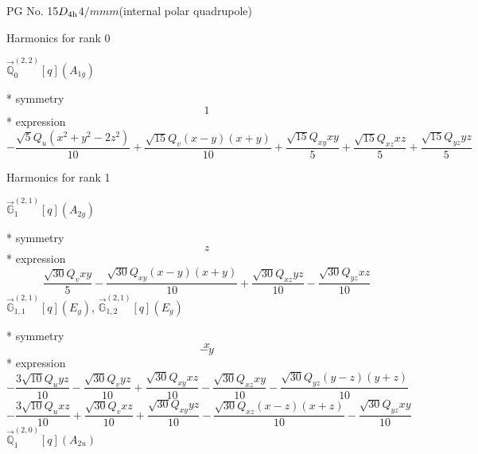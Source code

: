 \documentclass[fleqn,8pt]{jsarticle}
\begin{document}
\setcounter{MaxMatrixCols}{32}

\renewcommand{\tablename}{Table~}
\renewcommand{\figurename}{Figure~}
\begin{center}
\LARGE
PG No. 15\quad$D_{\rm 4h}$\quad$4/mmm$\quad[ tetragonal ] (internal polar quadrupole)
\end{center}

\noindent * Harmonics for rank 0

\noindent\quad $\vec{\mathbb{Q}}_{0}^{(2,2)}[q](A_{1g})$

\noindent\quad ** symmetry
\begin{dmath*}
1
\end{dmath*}
\noindent\quad ** expression
\begin{dmath*}
- \frac{\sqrt{5} Q_{u} \left(x^{2} + y^{2} - 2 z^{2}\right)}{10} + \frac{\sqrt{15} Q_{v} \left(x - y\right) \left(x + y\right)}{10} + \frac{\sqrt{15} Q_{xy} x y}{5} + \frac{\sqrt{15} Q_{xz} x z}{5} + \frac{\sqrt{15} Q_{yz} y z}{5}
\end{dmath*}

\noindent * Harmonics for rank 1

\noindent\quad $\vec{\mathbb{G}}_{1}^{(2,1)}[q](A_{2g})$

\noindent\quad ** symmetry
\begin{dmath*}
z
\end{dmath*}
\noindent\quad ** expression
\begin{dmath*}
\frac{\sqrt{30} Q_{v} x y}{5} - \frac{\sqrt{30} Q_{xy} \left(x - y\right) \left(x + y\right)}{10} + \frac{\sqrt{30} Q_{xz} y z}{10} - \frac{\sqrt{30} Q_{yz} x z}{10}
\end{dmath*}
\noindent\quad $\vec{\mathbb{G}}_{1,1}^{(2,1)}[q](E_{g})$, $\vec{\mathbb{G}}_{1,2}^{(2,1)}[q](E_{g})$

\noindent\quad ** symmetry
\begin{dmath*}
x
\end{dmath*}
\begin{dmath*}
- y
\end{dmath*}
\noindent\quad ** expression
\begin{dmath*}
- \frac{3 \sqrt{10} Q_{u} y z}{10} - \frac{\sqrt{30} Q_{v} y z}{10} + \frac{\sqrt{30} Q_{xy} x z}{10} - \frac{\sqrt{30} Q_{xz} x y}{10} - \frac{\sqrt{30} Q_{yz} \left(y - z\right) \left(y + z\right)}{10}
\end{dmath*}
\begin{dmath*}
- \frac{3 \sqrt{10} Q_{u} x z}{10} + \frac{\sqrt{30} Q_{v} x z}{10} + \frac{\sqrt{30} Q_{xy} y z}{10} - \frac{\sqrt{30} Q_{xz} \left(x - z\right) \left(x + z\right)}{10} - \frac{\sqrt{30} Q_{yz} x y}{10}
\end{dmath*}
\noindent\quad $\vec{\mathbb{Q}}_{1}^{(2,0)}[q](A_{2u})$
\end{document}
